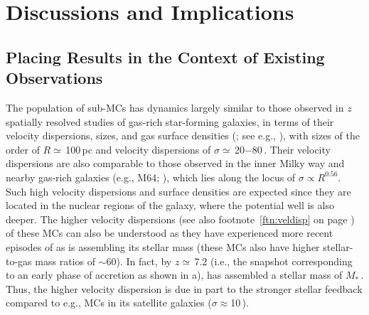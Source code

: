 \IfFileExists{emulateapjlegacy.cls}{\documentclass[iop]{emulateapjlegacy}}{\documentclass[iop]{emulateapj}}
\begin{document}
\section{Discussions and Implications}     \label{sec:diss}

\subsection{Placing Results in the Context of Existing Observations} \label{sec:diss1}

The population of sub-MCs has dynamics largely
similar to those observed
in $z$ spatially resolved studies of gas-rich star-forming galaxies, in
terms of their velocity dispersions, sizes, and gas surface densities (; see
e.g., \citealt{Swinbank11a}), with sizes of the order of $R\simeq$\,100\,pc and velocity
dispersions of $\sigma\simeq$\,20$-$80\,\kms.
Their velocity dispersions are also comparable to those observed in the inner Milky way and
nearby gas-rich galaxies (e.g., M64; \citealt{Oka01a, Rosolowsky05a, Heyer09a}), which lies
along the locus of $\sigma\propto R^{0.56}$.
Such high velocity dispersions and surface densities are expected since
they are located in the nuclear regions of the
galaxy, where the potential well is also deeper. The higher velocity dispersions (see also 
footnote~\ref{ftn:veldisp} on page \pageref{ftn:veldisp})
of these MCs can also be understood as they have experienced more recent episodes
of \SF as \flower is assembling its stellar mass (these MCs also have higher stellar-to-gas mass ratios of $\sim$60).
In fact, by $z\simeq$\,7.2 (i.e., the snapshot corresponding to an early phase of accretion as
shown in a), \flower has assembled
a stellar mass of $M_*$\,\Msun. Thus, the higher velocity dispersion
is due in part to the stronger stellar feedback compared to e.g., MCs in its satellite galaxies ($\sigma\approx$10\,\kms).
\end{document}
